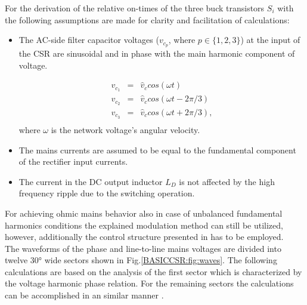 For the derivation of the relative on-times of the three buck transistors $S_i$ with the following assumptions are made for clarity and facilitation of calculations:
\begin{itemize}
	\item The AC-side filter capacitor voltages ($v_{c_p}$, where $p\in\{1,2,3\}$) at the input of the CSR are sinusoidal and in phase with the main harmonic component of voltage.
	
	\begin{equation}
        \begin{array}{rcl}
            v_{c_1}&=&\widehat{v}_ccos(\omega t)\\
						v_{c_2}&=&\widehat{v}_ccos(\omega t-2\pi/3)\\
						v_{c_3}&=&\widehat{v}_ccos(\omega t+2\pi/3),\\
        \end{array}
        \label{BASICMPC:equ:phasorvect}
    \end{equation}
	where $\omega$ is the network voltage's angular velocity.
	
	\item The mains currents are assumed to be equal to the fundamental component of the rectifier input currents.
	\item The current in the DC output inductor $L_{D}$ is not affected by the high frequency ripple due to the switching operation.
\end{itemize}

 For achieving ohmic mains behavior also in case of unbalanced fundamental harmonics conditions the explained modulation method can still be utilized, however, additionally the control structure presented in \cite{baumann2005novel} has to be employed.\\
The waveforms of the phase and line-to-line mains voltages are divided into twelve $30°$ wide sectors shown in Fig.\ref{BASICCSR:fig:waves}. The following calculations are based on the analysis of the first sector which is characterized by the voltage harmonic phase relation. For the remaining sectors the calculations can be accomplished in an similar manner \cite{nussbaumer2007comprehensive}.

